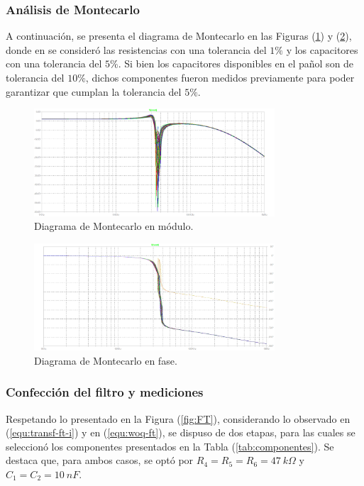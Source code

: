 \subsubsection{Análisis de Montecarlo}
A continuación, se presenta el diagrama de Montecarlo en las Figuras (\ref{fig:mc-mod}) y (\ref{fig:mc-pha}), donde en se consideró las resistencias con una tolerancia del $1\%$ y los capacitores con una tolerancia del $5\%$. Si bien los capacitores disponibles en el pañol son de tolerancia del $10\%$, dichos componentes fueron medidos previamente para poder garantizar que cumplan la tolerancia del $5\%$.
\begin{figure}[H]
\centering
	\includegraphics[width=0.8\textwidth]{ImagenesEjercicio4/MC-Mod-1.png}
	\caption{Diagrama de Montecarlo en módulo.}
	\label{fig:mc-mod}
\end{figure}
\begin{figure}[H]
\centering
	\includegraphics[width=0.8\textwidth]{ImagenesEjercicio4/MC-Pha-1.png}
	\caption{Diagrama de Montecarlo en fase.}
	\label{fig:mc-pha}
\end{figure}

\subsubsection{Confección del filtro y mediciones}

Respetando lo presentado en la Figura (\ref{fig:FT}), considerando lo observado en (\ref{equ:transf-ft-i}) y en (\ref{equ:woq-ft}), se dispuso de dos etapas, para las cuales se seleccionó los componentes presentados en la Tabla (\ref{tab:componentes}). Se destaca que, para ambos casos, se optó por $R_4 = R_5 = R_6 = 47 \ k\Omega$ y $C_1 = C_2 = 10 \ nF$.

